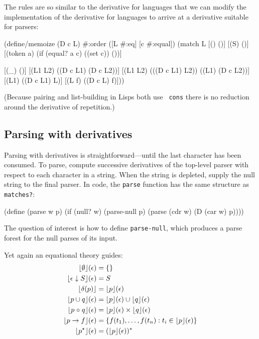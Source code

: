 The rules are so similar to the derivative for languages that we can modify the
implementation of the derivative for languages to arrive at a derivative
suitable for parsers:
\begin{code}
(define/memoize (D c L)
  #:order ([L #:eq] [c #:equal])
  (match L
    [(\ttempty)        (\ttempty)]
    [(\ttepsred S)    (\ttempty)] 
    [(token a)  (if (equal? a c)
                    (\ttepsred (set c)) 
                    (\ttempty))]
    
    [(\ttdelta _)      (\ttempty)]
    [(\ttcup L1 L2)  (\ttcup (D c L1) (D c L2))]
    [(\ttcirc L1 L2)  (\ttcup (\ttcirc (D c L1) L2))
                    (\ttcirc (\ttdelta L1) (D c L2))]
    [(\ttstar L1)     (\ttcirc (D c L1) L)]
    [(\ttred L f)   (\ttred (D c L) f)])) \end{code}
%
(Because pairing and list-building in Lisps both use {\tt
cons} there is no reduction around the derivative of repetition.)



\subsection{Parsing with derivatives}

Parsing with derivatives is straightforward---until the last character
has been consumed.
%
To parse, compute successive derivatives of the top-level parser with respect to each character in a string.
%
When the string is depleted, supply the null string to the final parser.
%
In code, the {\tt parse} function has the same structure as {\tt matches?}:
\begin{code}
 (define (parse w p)
  (if (null? w)
      (parse-null p)
      (parse (cdr w) (D (car w) p)))) \end{code}
%
The question of interest is how to define {\tt parse-null}, which produces a parse forest for the 
null parses of its input.

Yet again an equational theory guides:
\begin{align*}
  \lfloor \emptyset \rfloor(\epsilon) &= \left\{\right\}
  \\
  \lfloor \epsilon \downarrow S \rfloor(\epsilon) &= S
  \\
  \lfloor \delta(p) \rfloor &= \lfloor p \rfloor(\epsilon)
  \\
  \lfloor p \cup q \rfloor(\epsilon) &= \lfloor p \rfloor(\epsilon) \cup \lfloor q \rfloor(\epsilon)
  \\
  \lfloor p \mathrel{\circ} q \rfloor(\epsilon) &= \lfloor p \rfloor(\epsilon) \times \lfloor q \rfloor(\epsilon)
  \\
  \lfloor p \to f \rfloor(\epsilon) &= \left\{f(t_1),\ldots,f(t_n) : t_i \in \lfloor p \rfloor(\epsilon) \right\}
  \\
  \lfloor p^\star \rfloor(\epsilon) &= (\lfloor p \rfloor(\epsilon))^*
\end{align*}

